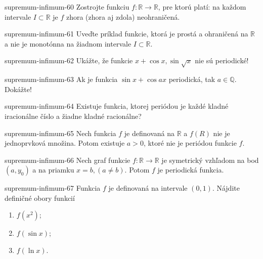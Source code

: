 \begin{defproblem}{supremum-infimum-60}
Zostrojte funkciu $f:\mathbb{R}\rightarrow\mathbb{R}$, pre ktorú platí: na každom intervale $I\subset\mathbb{R}$ je $f$ zhora (zhora aj zdola) neohraničená.
\end{defproblem}

\begin{defproblem}{supremum-infimum-61}
Uveďte príklad funkcie, ktorá je prostá a ohraničená na $\mathbb{R}$ a nie je monotónna na žiadnom intervale $I\subset\mathbb{R}$.
\end{defproblem}

\begin{defproblem}{supremum-infimum-62}
Ukážte, že funkcie $x+\cos x,\sin\sqrt{x}$ nie sú periodické!
\end{defproblem}

\begin{defproblem}{supremum-infimum-63}
Ak je funkcia $\sin x +\cos ax$ periodická, tak $a\in\mathbb{Q}$. Dokážte!
\end{defproblem}

\begin{defproblem}{supremum-infimum-64}
Existuje funkcia, ktorej periódou je každé kladné iracionálne číslo a žiadne kladné racionálne?
\end{defproblem}

\begin{defproblem}{supremum-infimum-65}
Nech funkcia $f$ je definovaná na $\mathbb{R}$ a $f(R)$ nie je jednoprvková množina. Potom existuje $a>0$, ktoré nie je periódou funkcie $f$.
\end{defproblem}

\begin{defproblem}{supremum-infimum-66}
Nech graf funkcie $f:\mathbb{R}\rightarrow\mathbb{R}$ je symetrický vzhľadom na bod $(a,y_0)$ a na priamku $x=b,(a\neq b)$. Potom $f$ je periodická funkcia.
\end{defproblem}

\begin{defproblem}{supremum-infimum-67}
Funkcia $f$ je definovaná na intervale $(0,1)$. Nájdite definičné obory funkcií
\begin{enumerate}
\item $f(x^2)$;
\item $f(\sin x)$;
\item $f(\ln x)$.
\end{enumerate}
\end{defproblem}


